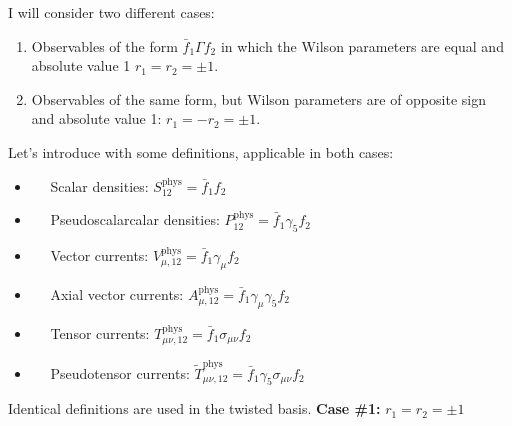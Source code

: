 \documentclass[english, LaM, oneside, noexaminfo]{sapthesis}
\begin{document}
I will consider two different cases:
\begin{enumerate}
    \item Observables of the form $\bar f_1 \Gamma f_2$ in which the Wilson parameters are equal and absolute value 1 $r_1 = r_2 = \pm 1$.
    \item Observables of the same form, but Wilson parameters are of opposite sign and absolute value 1: $r_1 = -r_2 = \pm 1$.
\end{enumerate}
Let's introduce with some definitions, applicable in both cases:
\begin{itemize}
    \item [] $\quad$ Scalar densities: \hspace*{5mm} $S_{12}^\text{phys} = \bar f_1 f_2$
    \item [] $\quad$ Pseudoscalarcalar densities: \hspace*{5mm} $P^{\text{phys}}_{12} = \bar f_1 \gamma_5 f_2$
    \item [] $\quad$ Vector currents: \hspace*{5mm} $V_{\mu,12}^{\text{phys}} = \bar f_1 \gamma_\mu f_2$
    \item [] $\quad$ Axial vector currents: \hspace*{5mm} $A_{\mu,12}^{\text{phys}} = \bar f_1 \gamma_\mu \gamma_5 f_2$
    \item [] $\quad$ Tensor currents: \hspace*{5mm} $T_{\mu\nu,12}^{\text{phys}} = \bar f_1 \sigma_{\mu\nu} f_2$
    \item [] $\quad$ Pseudotensor currents: \hspace*{5mm} $\tilde{T}_{\mu\nu,12}^{\text{phys}} = \bar f_1 \gamma_5\sigma_{\mu\nu} f_2$
\end{itemize}
Identical definitions are used in the twisted basis.
\newline
\newline
{\bf Case \#1: } $r_1 = r_2 = \pm 1$
\end{document}
